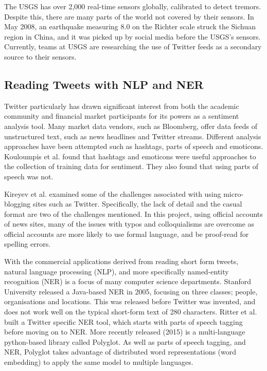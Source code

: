 The USGS has over 2,000 real-time sensors globally, calibrated to detect tremors. Despite this, there are many parts of the world not covered by their sensors\cite{usgs_stats}. In May 2008, an earthquake measuring 8.0 on the Richter scale struck the Sichuan region in China, and it was picked up by social media before the USGS's sensors. Currently, teams at USGS are researching the use of Twitter feeds as a secondary source to their sensors\cite{USGS_twitter}.

\subsection{Reading Tweets with NLP and NER}

Twitter particularly has drawn significant interest from both the academic community and financial market participants for its powers as a sentiment analysis tool. Many market data vendors, such as Bloomberg, offer data feeds of unstructured text, such as news headlines and Twitter streams\cite{bloomberg}. Different analysis approaches have been attempted such as hashtags, parts of speech and emoticons. Kouloumpis et al. found that hashtags and emoticons were useful approaches to the collection of training data for sentiment\cite{Twittersentiment}. They also found that using parts of speech was not.

Kireyev et al.\cite{Kireyev_Applications} examined some of the challenges associated with using micro-blogging sites such as Twitter. Specifically, the lack of detail and the casual format are two of the challenges mentioned. In this project, using official accounts of news sites, many of the issues with typos and colloquialisms are overcome as official accounts are more likely to use formal language, and be proof-read for spelling errors.

With the commercial applications derived from reading short form tweets, natural language processing (NLP), and more specifically named-entity recognition (NER) is a focus of many computer science departments\cite{polyglotner}\cite{ritter_nlp}\cite{stanford_ner}. Stanford University released a Java-based NER in 2005\cite{stanford_ner}, focusing on three classes; people, organisations and locations. This was released before Twitter was invented, and does not work well on the typical short-form text of 280 characters. Ritter et al.\cite{ritter_nlp} built a Twitter specific NER tool, which starts with parts of speech tagging before moving on to NER. More recently released (2015) is a multi-language python-based library called Polyglot\cite{polyglotner}. As well as parts of speech tagging, and NER, Polyglot takes advantage of distributed word representations (word embedding) to apply the same model to multiple languages.

